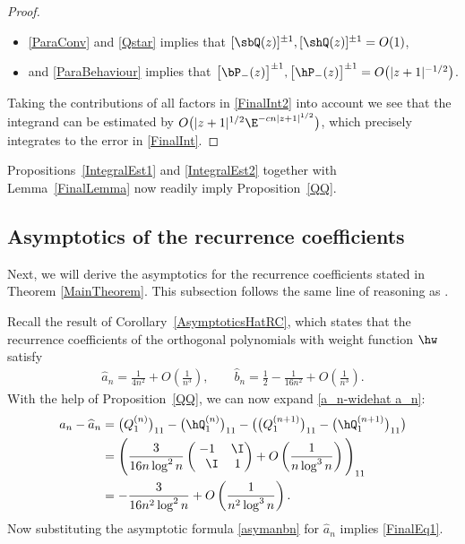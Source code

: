 \begin{proof}
\begin{itemize}
\begin{align*}
\begin{cases}
\begin{pmatrix}
 0 & 0
 \\
 \big(\Fw(s)-\hFw(s)\big)\phi^{-2n}(s) & 0
 \end{pmatrix}
 \\
 \quad= O\big(|s+1|^{3/2}\E^{-cn|s+1|^{1/2}}\big),\qquad s \in \Sigma^U \setminus (-1,1),
 \\
  0, \qquad s \in \Sigma^U \cap (-1,1),
 \end{cases}
 \end{align*}
 \item \eqref{ParaConv} and \eqref{Qstar} implies that $[\sbQ(z)]^{\pm 1}, [\shQ(z)]^{\pm 1} = O(1)$,
 \item and \eqref{ParaBehaviour} implies that $\big[\bP_-(z)\big]^{\pm 1}, \big[\hP_-(z)\big]^{\pm 1} = O\big(|z+1|^{-1/2}\big)$.
\end{itemize}
Taking the contributions of all factors in \eqref{FinalInt2} into account we see that the integrand can be estimated by $O\big(|z+1|^{1/2}\E^{-cn|z+1|^{1/2}}\big)$, which precisely integrates to the error in \eqref{FinalInt}.
\end{proof}

Propositions~\ref{IntegralEst1} and \ref{IntegralEst2} together with Lemma~\ref{FinalLemma} now readily imply Proposition~\ref{QQ}.

\subsection{Asymptotics of the recurrence coefficients}
Next, we will derive the asymptotics for the recurrence coefficients stated in Theorem \ref{MainTheorem}. This subsection follows the same line of reasoning as \cite[Section~5.2]{CD}.

Recall the result of Corollary~\ref{AsymptoticsHatRC}, which states that the recurrence coefficients of the orthogonal polynomials with weight function $\hw$ satisfy
\begin{align}\label{asymanbn}
\widehat a_n= \frac{1}{4n^2} + O\left(\frac{1}{n^3}\right),\qquad \widehat b_n = \frac{1}{2}-\frac{1}{16n^2} + O\left(\frac{1}{n^3}\right).
\end{align}
With the help of Proposition~\ref{QQ}, we can now expand \eqref{a_n-widehat a_n}:
\begin{align*}
 a_n -\widehat a_n &= \big(Q_1^{(n)}\big)_{11}-\big(\hQ_1^{(n)}\big)_{11} - \big(\big(Q_1^{(n+1)}\big)_{11}-\big(\hQ_1^{(n+1)}\big)_{11}\big)
 \\
 &= \Bigg( \frac{3}{16n \log^2n} \begin{pmatrix}
-1 & \I\\
\phantom{-}\I & 1
\end{pmatrix} + O\left(\frac{1}{n\log^3 n}\right) \Bigg)_{11}
\\&= -\frac{3}{16n^2\log^2 n} + O\left( \frac{1}{n^2\log^3 n}\right).
\end{align*}
Now substituting the asymptotic formula \eqref{asymanbn} for $\widehat a_n$ implies \eqref{FinalEq1}.

